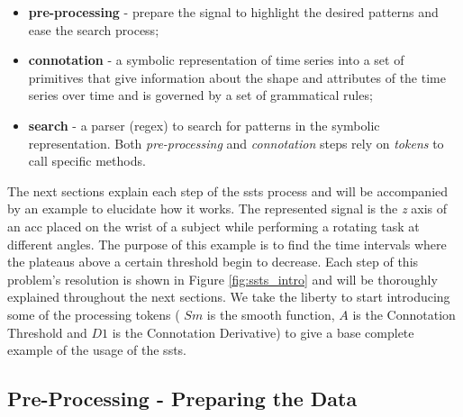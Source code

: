 \begin{itemize}
\item \textbf{pre-processing} - prepare the signal to highlight the desired patterns and ease the search process;
\item \textbf{connotation} - a symbolic representation of time series into a set of primitives that give information about the shape and attributes of the time series over time and is governed by a set of grammatical rules;
\item \textbf{search} - a parser (\gls{regex}) to search for patterns in the symbolic representation. Both \textit{pre-processing} and \textit{connotation} steps rely on \textit{tokens} to call specific methods. 
\end{itemize}

The next sections explain each step of the \gls{ssts} process and will be accompanied by an example to elucidate how it works. The represented signal is the \textit{z} axis of an \gls{acc} placed on the wrist of a subject while performing a rotating task at different angles. The purpose of this example is to find the time intervals where the plateaus above a certain threshold begin to decrease. Each step of this problem's resolution is shown in Figure \ref{fig:ssts_intro} and will be thoroughly explained throughout the next sections. We take the liberty to start introducing some of the processing tokens ( $Sm$ is the smooth function, $A$ is the Connotation Threshold and $D1$ is the Connotation Derivative) to give a base complete example of the usage of the \gls{ssts}.


\subsection{Pre-Processing - Preparing the Data}

